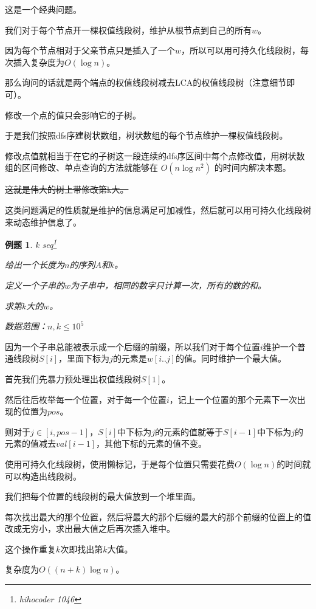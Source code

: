 \documentclass[a4paper]{article}
\newtheorem{problem}{例题}
\begin{document}
这是一个经典问题。

我们对于每个节点开一棵权值线段树，维护从根节点到自己的所有$w$。

因为每个节点相对于父亲节点只是插入了一个$w$，所以可以用可持久化线段树，每次插入复杂度为$O(\log n)$。

那么询问的话就是两个端点的权值线段树减去LCA的权值线段树（注意细节即可）。

修改一个点的值只会影响它的子树。

于是我们按照dfs序建树状数组，树状数组的每个节点维护一棵权值线段树。

修改点值就相当于在它的子树这一段连续的dfs序区间中每个点修改值，用树状数组的区间修改、单点查询的方法就能够在 $O(n\log n^2)$ 的时间内解决本题。

\sout{这就是伟大的树上带修改第k大。}

\bigskip

这类问题满足的性质就是维护的信息满足可加减性，然后就可以用可持久化线段树来动态维护信息了。

\begin{problem}
  k seq\footnote{hihocoder 1046}

  给出一个长度为$n$的序列$A$和$k$。

  定义一个子串的$w$为子串中，相同的数字只计算一次，所有的数的和。

  求第$k$大的$w$。

  数据范围：$n, k\leq 10^5$
\end{problem}

因为一个子串总能被表示成一个后缀的前缀，所以我们对于每个位置$i$维护一个普通线段树$S[i]$，里面下标为$j$的元素是$w[i..j]$的值。同时维护一个最大值。

首先我们先暴力预处理出权值线段树$S[1]$。

然后往后枚举每一个位置，对于每一个位置$i$，记上一个位置的那个元素下一次出现的位置为$pos$。

则对于$j\in [i, pos - 1]$，$S[i]$中下标为$j$的元素的值就等于$S[i-1]$中下标为$j$的元素的值减去$val[i-1]$，其他下标的元素的值不变。

使用可持久化线段树，使用懒标记，于是每个位置只需要花费$O(\log n)$的时间就可以构造出线段树。

我们把每个位置的线段树的最大值放到一个堆里面。

每次找出最大的那个位置，然后将最大的那个后缀的最大的那个前缀的位置上的值改成无穷小，求出最大值之后再次插入堆中。

这个操作重复$k$次即找出第$k$大值。

复杂度为$O((n+k)\log n)$。
\end{document}
